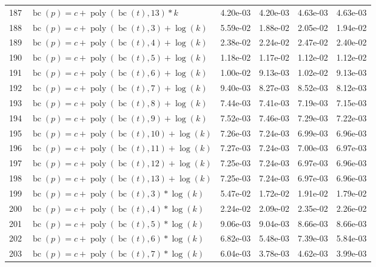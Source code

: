 \documentclass[12pt,a4paper]{article}
\DeclareMathOperator{\bc}{bc}
\DeclareMathOperator{\poly}{poly}
\begin{document}
\begin{longtable}[t]{ll>{\raggedleft\arraybackslash}p{2cm}>{\raggedleft\arraybackslash}p{2cm}>{\raggedleft\arraybackslash}p{2cm}>{\raggedleft\arraybackslash}p{2cm}}
\rowcolor{gray!6}  187 & $\bc(p) = c + \poly\left( \bc(t), 13 \right) * k$ & 4.20e-03 & 4.20e-03 & 4.63e-03 & 4.63e-03\\
188 & $\bc(p) = c + \poly\left( \bc(t), 3 \right) + \log(k)$ & 5.59e-02 & 1.88e-02 & 2.05e-02 & 1.94e-02\\
\rowcolor{gray!6}  189 & $\bc(p) = c + \poly\left( \bc(t), 4 \right) + \log(k)$ & 2.38e-02 & 2.24e-02 & 2.47e-02 & 2.40e-02\\
190 & $\bc(p) = c + \poly\left( \bc(t), 5 \right) + \log(k)$ & 1.18e-02 & 1.17e-02 & 1.12e-02 & 1.12e-02\\
\rowcolor{gray!6}  191 & $\bc(p) = c + \poly\left( \bc(t), 6 \right) + \log(k)$ & 1.00e-02 & 9.13e-03 & 1.02e-02 & 9.13e-03\\
192 & $\bc(p) = c + \poly\left( \bc(t), 7 \right) + \log(k)$ & 9.40e-03 & 8.27e-03 & 8.52e-03 & 8.12e-03\\
\rowcolor{gray!6}  193 & $\bc(p) = c + \poly\left( \bc(t), 8 \right) + \log(k)$ & 7.44e-03 & 7.41e-03 & 7.19e-03 & 7.15e-03\\
194 & $\bc(p) = c + \poly\left( \bc(t), 9 \right) + \log(k)$ & 7.52e-03 & 7.46e-03 & 7.29e-03 & 7.22e-03\\
\rowcolor{gray!6}  195 & $\bc(p) = c + \poly\left( \bc(t), 10 \right) + \log(k)$ & 7.26e-03 & 7.24e-03 & 6.99e-03 & 6.96e-03\\
196 & $\bc(p) = c + \poly\left( \bc(t), 11 \right) + \log(k)$ & 7.27e-03 & 7.24e-03 & 7.00e-03 & 6.97e-03\\
\rowcolor{gray!6}  197 & $\bc(p) = c + \poly\left( \bc(t), 12 \right) + \log(k)$ & 7.25e-03 & 7.24e-03 & 6.97e-03 & 6.96e-03\\
198 & $\bc(p) = c + \poly\left( \bc(t), 13 \right) + \log(k)$ & 7.25e-03 & 7.24e-03 & 6.97e-03 & 6.96e-03\\
\rowcolor{gray!6}  199 & $\bc(p) = c + \poly\left( \bc(t), 3 \right) * \log(k)$ & 5.47e-02 & 1.72e-02 & 1.91e-02 & 1.79e-02\\
200 & $\bc(p) = c + \poly\left( \bc(t), 4 \right) * \log(k)$ & 2.24e-02 & 2.09e-02 & 2.35e-02 & 2.26e-02\\
\rowcolor{gray!6}  201 & $\bc(p) = c + \poly\left( \bc(t), 5 \right) * \log(k)$ & 9.06e-03 & 9.04e-03 & 8.66e-03 & 8.66e-03\\
202 & $\bc(p) = c + \poly\left( \bc(t), 6 \right) * \log(k)$ & 6.82e-03 & 5.48e-03 & 7.39e-03 & 5.84e-03\\
\rowcolor{gray!6}  203 & $\bc(p) = c + \poly\left( \bc(t), 7 \right) * \log(k)$ & 6.04e-03 & 3.78e-03 & 4.62e-03 & 3.99e-03\\

\end{longtable}
\end{document}
